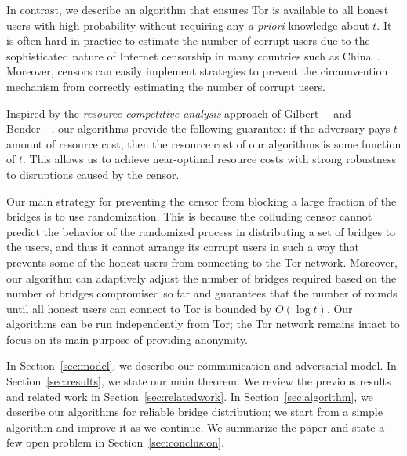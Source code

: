 In contrast, we describe an algorithm that ensures Tor is available to all honest users with high probability without requiring any \emph{a priori} knowledge about $t$. 
It is often hard in practice to estimate the number of corrupt users due to the sophisticated nature of Internet censorship in many countries such as China~\cite{Oni:2012:China,Ensafi2015b}. Moreover, censors can easily implement strategies to prevent the circumvention mechanism from correctly estimating the number of corrupt users.

Inspired by the \emph{resource competitive analysis} approach of Gilbert~\etal~\cite{Gilbert:2012:RAN:2335470.2335471} and Bender~\etal~\cite{Bender:2015:SIGACT}, our algorithms provide the following guarantee: if the adversary pays $t$ amount of resource cost, then the resource cost of our algorithms is some function of $t$. This allows us to achieve near-optimal resource costs with strong robustness to disruptions caused by the censor.

Our main strategy for preventing the censor from blocking a large fraction of the bridges is to use randomization. This is because the colluding censor cannot predict the behavior of the randomized process in distributing a set of bridges to the users, and thus it cannot arrange its corrupt users in such a way that prevents some of the honest users from connecting to the Tor network. Moreover, our algorithm can adaptively adjust the number of bridges required based on the number of bridges compromised so far and guarantees that the number of rounds until all honest users can connect to Tor is bounded by $O(\log{t})$. Our algorithms can be run independently from Tor; the Tor network remains intact to focus on its main purpose of providing anonymity.

In Section~\ref{sec:model}, we describe our communication and adversarial model. In Section~\ref{sec:results}, we state our main theorem. We review the previous results and related work in Section~\ref{sec:relatedwork}. In Section~\ref{sec:algorithm}, we describe our algorithms for reliable bridge distribution; we start from a simple algorithm and improve it as we continue. We summarize the paper and state a few open problem in Section~\ref{sec:conclusion}.

